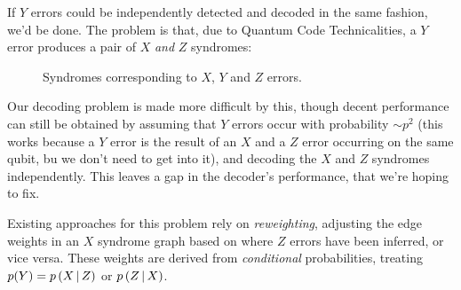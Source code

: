 \documentclass[a4paper, english]{scrartcl}
\begin{document}
If $Y$ errors could be independently detected and decoded in the same fashion, we'd be done. 
The problem is that, due to Quantum Code Technicalities\textsuperscript{\textregistered}, a $Y$ error produces a pair of $X$ \emph{and} $Z$ syndromes:
\begin{figure}[!h]
\centering
{}
\caption{Syndromes corresponding to $X$, $Y$ and $Z$ errors.}
\end{figure}

Our decoding problem is made more difficult by this, though decent performance can still be obtained by assuming that $Y$ errors occur with probability $\sim p^2$ (this works because a $Y$ error is the result of an $X$ and a $Z$ error occurring on the same qubit, bu we don't need to get into it), and decoding the $X$ and $Z$ syndromes independently.
This leaves a gap in the decoder's performance, that we're hoping to fix.
 
Existing approaches for this problem \cite{Fowler, DelfosseTillich} rely on \emph{reweighting}, adjusting the edge weights in an $X$ syndrome graph based on where $Z$ errors have been inferred, or vice versa. 
These weights are derived from \emph{conditional} probabilities, treating $p(Y)=p\left(X\, \middle \vert \, Z \right)$ or $p\left(Z\, \middle \vert \, X \right)$.
\end{document}
